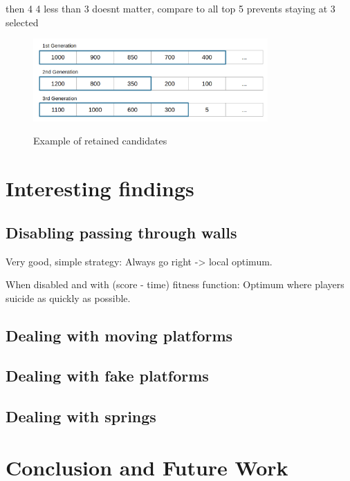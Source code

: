 \documentclass[a4paper,12pt,pagesize,headsepline,bibtotoc,titlepage,abstracton]{scrartcl}
\begin{document}
then 4 
4 less than 3 doesnt matter, compare to all top 5
prevents staying at 3 selected
\begin{figure}[h]
\begin{center}
\includegraphics*[width=0.8\textwidth]{images/retain_candidates}\\
\caption{Example of retained candidates}
\label{abb:retaining}
\end{center}
\end{figure}



\section{Interesting findings}
\subsection{Disabling passing through walls}
Very good, simple strategy: Always go right -> local optimum.

When disabled and with (score - time) fitness function: Optimum where players suicide as quickly as possible. 
\subsection{Dealing with moving platforms}
\subsection{Dealing with fake platforms}
\subsection{Dealing with springs}
\section{Conclusion and Future Work}

\newpage

 
\end{document}
